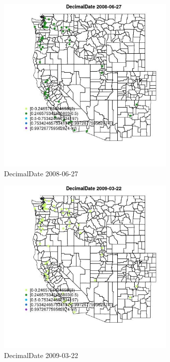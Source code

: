 \begin{figure} 
\centering  
\includegraphics[width=0.77\textwidth]{Code_Outputs/Report_ML_input_PM25_Step4_part_e_de_duplicated_aves_MapObsDecimalDate2008-06-27.jpg} 
\caption{\label{fig:Report_ML_input_PM25_Step4_part_e_de_duplicated_avesMapObsDecimalDate2008-06-27}DecimalDate 2008-06-27} 
\end{figure} 
 

\begin{figure} 
\centering  
\includegraphics[width=0.77\textwidth]{Code_Outputs/Report_ML_input_PM25_Step4_part_e_de_duplicated_aves_MapObsDecimalDate2009-03-22.jpg} 
\caption{\label{fig:Report_ML_input_PM25_Step4_part_e_de_duplicated_avesMapObsDecimalDate2009-03-22}DecimalDate 2009-03-22} 
\end{figure} 
 

